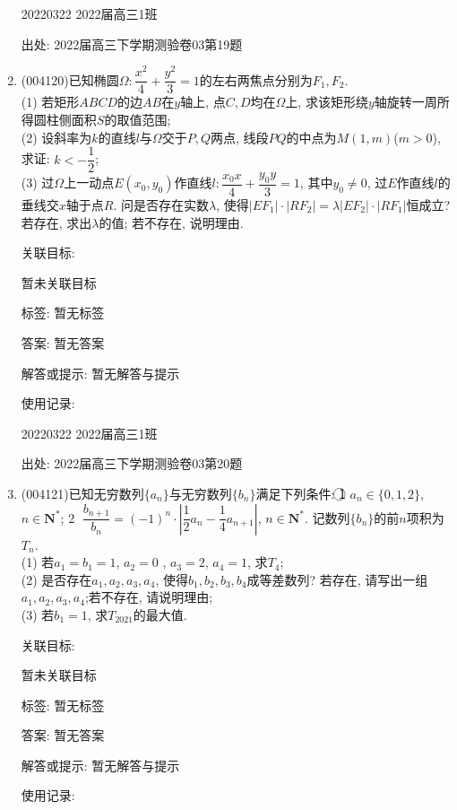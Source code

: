 \documentclass[10pt,a4paper]{article}
\begin{document}
\begin{enumerate}[1.]
20220322	2022届高三1班		


出处: 2022届高三下学期测验卷03第19题
\item { (004120)}已知椭圆$\Omega :\dfrac{x^2}4+\dfrac{y^2}3=1$的左右两焦点分别为$F_1,F_2$.\\
(1) 若矩形$ABCD$的边$AB$在$y$轴上, 点$C,D$均在$\Omega$上, 求该矩形绕$y$轴旋转一周所得圆柱侧面积$S$的取值范围;\\
(2) 设斜率为$k$的直线$l$与$\Omega$交于$P,Q$两点, 线段$PQ$的中点为$M(1,m)$($m>0$), 求证: $k<-\dfrac 12$;\\
(3) 过$\Omega$上一动点$E(x_0,y_0)$作直线$l:\dfrac{x_0x}4+\dfrac{y_0y}3=1$, 其中$y_0\ne 0$, 过$E$作直线$l$的垂线交$x$轴于点$R$. 问是否存在实数$\lambda$, 使得$|EF_1|\cdot |RF_2|=\lambda |EF_2|\cdot |RF_1|$恒成立? 若存在, 求出$\lambda$的值; 若不存在, 说明理由.


关联目标:

暂未关联目标



标签: 暂无标签

答案: 暂无答案

解答或提示: 暂无解答与提示

使用记录:

20220322	2022届高三1班			


出处: 2022届高三下学期测验卷03第20题
\item { (004121)}已知无穷数列$\{a_n\}$与无穷数列$\{b_n\}$满足下列条件:
\textcircled{1} $a_n\in \{0,1,2\}$, $n\in \mathbf{N}^*$; \textcircled{2} $\dfrac{b_{n+1}}{b_n}=(-1)^n\cdot |\dfrac 12a_n-\dfrac 14a_{n+1}|$, $n\in \mathbf{N}^*$. 记数列$\{b_n\}$的前$n$项积为$T_n$.\\
(1) 若$a_1=b_1=1$, $a_2=0$ , $a_3=2$, $a_4=1$, 求$T_4$;\\
(2) 是否存在$a_1,a_2,a_3,a_4$, 使得$b_1,b_2,b_3,b_4$成等差数列? 若存在, 请写出一组$a_1,a_2,a_3,a_4$;若不存在, 请说明理由;\\
(3) 若$b_1=1$, 求$T_{2021}$的最大值.


关联目标:

暂未关联目标



标签: 暂无标签

答案: 暂无答案

解答或提示: 暂无解答与提示

使用记录:


\end{enumerate}
\end{document}

